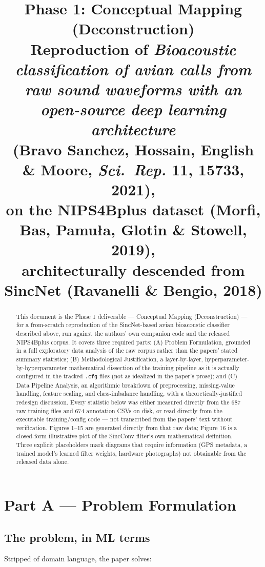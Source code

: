 \documentclass[11pt]{article}
\title{\Large Phase 1: Conceptual Mapping (Deconstruction)\\[4pt]
\large Reproduction of \emph{Bioacoustic classification of avian calls from raw sound
waveforms with an open-source deep learning architecture}\\
(Bravo Sanchez, Hossain, English \& Moore, \emph{Sci.\ Rep.} 11, 15733, 2021),\\
on the NIPS4Bplus dataset (Morfi, Bas, Pamu\l{}a, Glotin \& Stowell, 2019),\\
architecturally descended from SincNet (Ravanelli \& Bengio, 2018)}
\author{}
\date{}
\begin{document}
\maketitle

\begin{abstract}
\noindent This document is the Phase 1 deliverable --- Conceptual Mapping
(Deconstruction) --- for a from-scratch reproduction of the SincNet-based
avian bioacoustic classifier described above, run against the authors' own
companion code and the released NIPS4Bplus corpus. It covers three required
parts: (A) Problem Formulation, grounded in a full exploratory data analysis
of the raw corpus rather than the papers' stated summary statistics; (B)
Methodological Justification, a layer-by-layer, hyperparameter-by-hyperparameter
mathematical dissection of the training pipeline as it is actually configured
in the tracked \texttt{.cfg} files (not as idealized in the paper's prose);
and (C) Data Pipeline Analysis, an algorithmic breakdown of preprocessing,
missing-value handling, feature scaling, and class-imbalance handling, with a
theoretically-justified redesign discussion. Every statistic below was either
measured directly from the 687 raw training files and 674 annotation CSVs on
disk, or read directly from the executable training/config code --- not
transcribed from the papers' text without verification. Figures 1--15 are
generated directly from that raw data; Figure 16 is a closed-form illustrative
plot of the SincConv filter's own mathematical definition. Three explicit
placeholders mark diagrams that require information (GPS metadata, a trained
model's learned filter weights, hardware photographs) not obtainable from the
released data alone.
\end{abstract}

\tableofcontents
\newpage

\section{Part A --- Problem Formulation}

\subsection{The problem, in ML terms}
\label{sec:A1}

Stripped of domain language, the paper solves:
\end{document}

